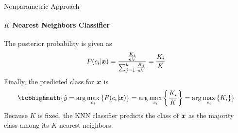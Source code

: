 \begin{frame}{Nonparametric Approach}
\framesubtitle{$K$ Nearest Neighbors Classif\/{i}er}
The posterior probability is given as
\begin{align*}
  P(c_i|{\boldsymbol x}) =
  \frac{\frac{K_i}{n V}}{\sum_{j=1}^k \frac{K_{j}}{n V}}
  = \frac{K_i}{K}
\end{align*}
F{i}nally, the predicted class for ${\boldsymbol x}$ is
\begin{align*}
\tcbhighmath{
  \hy = \arg\max_{c_i} \lB\{ P(c_i | \bx) \rB\} =
  \arg\max_{c_i} \lB\{ \frac{K_i}{K} \rB\} =
  \arg\max_{c_i}  \lB\{ K_i \rB\}
}
\end{align*}
Because $K$ is f\/{i}xed, the KNN classif\/{i}er predicts the class of ${\boldsymbol x}$ as
the majority class among its $K$ nearest neighbors.
\end{frame}


